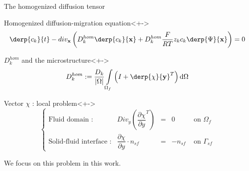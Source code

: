 \begin{frame}{The homogenized diffusion tensor}
%
\begin{block}{Homogenized diffusion-migration equation}<+->
\[\derp{c_k}{t}-div_{\mathbf{x}}\left(D_k^{hom}\derp{c_k}{\mathbf{x}}+D_k^{hom}\frac{F}{RT}z_k c_k\derp{\Psi}{\mathbf{x}}\right)=0\]
\end{block}
\begin{block}{$D_k^{hom}$ and the microstructure}<+->%
\[D_k^{hom}:=\dfrac{D_k}{|\Omega|}\int\limits_{\Omega_f}\left(I+\derp{\chi}{\mathbf{y}}^T\right)\text{d}\Omega\]
\end{block}
%
\begin{block}{Vector $\chi$ : local problem}<+->
\vspace{-0.3cm}
\[%
\left\{%
\begin{array}{llccr}
\text{Fluid domain :}&Div_y \left( \dfrac{\partial{\chi}}{\partial{y}}^T\right) &=& 0&\text{ on }\Omega_f \\
\text{Solid-fluid interface :}&\dfrac{\partial{\chi}}{\partial{y}} \cdot n_{sf}&=&-n_{sf}&\text{ on }\Gamma_{sf}
\end{array}
\right.
\]

We focus on this problem in this work.
\end{block}
%
\end{frame}

